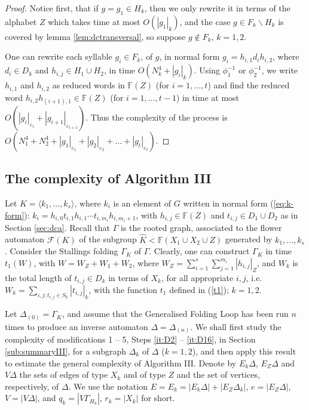 \documentclass[a4paper,12pt]{article}
\newcommand{\G}{\Gamma }
\newcommand{\D}{\Delta }
\newcommand{\e}{\varepsilon }
\newcommand{\T}{\Theta }
\newcommand{\cF}{{\cal{F}}}
\numberwithin{equation}{section}
\numberwithin{figure}{section}
\newcommand{\FF}{\ensuremath{\mathbb{F}}}
\renewcommand{\cF}{\mathcal{F}}
\newcommand{\la}{\langle}
\newcommand{\ra}{\rangle}
\begin{document}
\begin{proof} Notice first, that if $g = g_1 \in H_k$, then we
only rewrite it in terms of the  alphabet $Z$ which takes time at most
$O(|g_1|_k)$, and the case $g \in F_k \smallsetminus H_k$ is
covered by lemma \ref{lem:dctransversal}, so suppose $g \notin
F_k$, $k=1,2$.

One can rewrite each syllable $g_i \in F_k$, of $g$, in normal form
$g_i=h_{i,1}d_ih_{i,2}$, where $d_i\in D_k$ and $h_{i,j}\in H_1\cup
H_2$, in time  $O(N^4_k + |g_i|_k)$. Using $\phi_1^{-1}$ or
$\phi_2^{-1}$, we write $h_{i,1}$ and $h_{i,2}$ as reduced words
in $\FF(Z)$ (for $i=1, \ldots, t$) and find the reduced word
$h_{i,2}h_{(i+1),1}\in \FF(Z)$ (for $i=1, \ldots, t-1$) in time at
most $O(|g_i|_{\e_i}+|g_{i+1}|_{\e_{i+1}})$.  Thus the
complexity of the process is $O(N^4_1+ N^4_2 +
|g_1|_{\e_1}+|g_2|_{\e_2}+ \ldots +|g_t|_{\e_t})$. \end{proof}


\subsection{The complexity of Algorithm III}\label{sub:resolution}

Let $K=\la k_1, \ldots , k_s\ra$, where $k_i$ is an element of $G$
written in normal form (\ref{eq:k-form}): $k_i=
h_{i,0}t_{i,1}h_{i,1}\cdots t_{i,m_i}h_{i,m_i+1}$, with
$h_{i,j}\in \FF(Z)$ and $t_{i,j}\in D_1\cup D_2$ as in Section
\ref{sec:dca}. Recall that $\G$ is the rooted graph, associated to
the flower automaton $\cF(K)$ of the subgroup $\hat K < \FF(X_1\cup
X_2 \cup Z)$ generated by $k_1, \ldots , k_s$.
Consider the Stallings folding $\G_K$ of $\G$. Clearly, one can
construct $\G_K$ in time  $t_1(W)$, with $W = W_Z+W_1+W_2$,
 where $W_Z =
\mathop{\sum}\limits_{i=1}^{s}
\mathop{\sum}\limits_{j=1}^{m_i}|h_{i,j}|_Z$, and $W_k$ is the
total length of $t_{i,j} \in D_k$ in terms of $X_k$, for all
appropriate $i,j$, i.e. $W_k = \mathop{\sum}\limits_{i,j:
t_{i,j}\in S_k} |t_{i,j}|_k$, with the function $t_1$ defined in
(\ref{t1}); $k=1,2$.

Let $\D_{(0)} = \G_K$,
 and assume that the Generalised Folding Loop has been run $n$ times to produce an
inverse automaton $\D=\D_{(n)}$.
We shall
first study  the complexity of modifications 1 -- 5, 
Steps  \ref{it:D2} -- \ref{it:D16}, in Section \ref{sub:summaryIII},
for a subgraph $\D_k$ of $\D$ ($k=1,2$), and then apply this result
to estimate the general complexity of Algorithm III.  Denote by $E_k
\D$, $E_Z \D$ and $V\D$ the sets of edges of type $X_k$ and of
type $Z$ and the set of vertices, respectively, of  $\D$.
 We use the notation $E=E_k = |E_k \D| + |E_Z \D_k|$, $e = |E_Z \D|$, $V = |V \D|$, and $q_k = |V
\G_{H_k}|$, $r_k = |X_k|$ for short.
\end{document}
